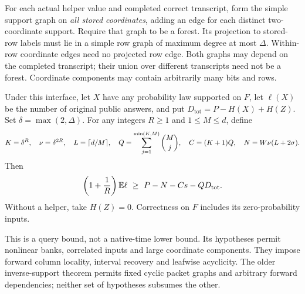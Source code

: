 For each actual helper value and completed correct transcript, form the simple
support graph on \emph{all stored coordinates}, adding an edge for each distinct
two-coordinate support. Require that graph to be a forest. Its projection to
stored-row labels must lie in a simple row graph of maximum degree at most
$\Delta$. Within-row coordinate edges need no projected row edge. Both graphs
may depend on the completed transcript; their union over different transcripts
need not be a forest. Coordinate components may contain arbitrarily many bits
and rows.

\begin{theorem}\label{thm:adaptive-coded-forest}
Under this interface, let $X$ have any probability law supported on $F$,
let $\ell(X)$ be the number of original public answers, and put
$D_{\mathrm{tot}}=P-H(X)+H(Z)$. Set $\delta=\max(2,\Delta)$. For any integers
$R\ge1$ and $1\le M\le d$, define
\[
 K=\delta^R,\quad \nu=\delta^{2R},\quad L=\lceil d/M\rceil,\quad
 Q=\sum_{j=1}^{\min(K,M)}\binom Mj,\quad
 C=(K+1)Q,\quad N=W\nu(L+2\sigma).
\]
Then
\begin{equation}\label{eq:adaptive-coded-forest}
 \left(1+\frac1R\right)\mathbb E\ell
 \ \ge\ P-N-Cs-QD_{\mathrm{tot}}.
\end{equation}
Without a helper, take $H(Z)=0$. Correctness on $F$ includes its
zero-probability inputs.
\end{theorem}

This is a query bound, not a native-time lower bound. Its hypotheses permit
nonlinear banks, correlated inputs and large coordinate components. They impose
forward column locality, interval recovery and leafwise acyclicity. The older
inverse-support theorem permits fixed cyclic packet graphs and arbitrary
forward dependencies; neither set of hypotheses subsumes the other.

